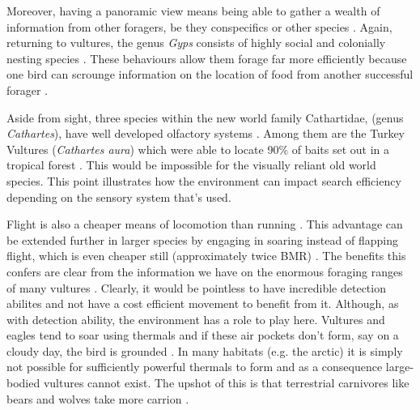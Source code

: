 \documentclass[a4paper,12pt]{article}
\begin{document}
Moreover, having a panoramic view means being able to gather a wealth of information from other foragers, be they conspecifics or other species \citep{jackson2008effect}. Again, returning to vultures, the genus \textit{Gyps} consists of highly social and colonially nesting species \citep{fernandez2015density}. These behaviours allow them forage far more efficiently because one bird can scrounge information on the location of food from another successful forager \citep{KaneVul}. 

Aside from sight, three species within the new world family Cathartidae, (genus \textit{Cathartes}), have well developed olfactory systems \citep{AR:AR22815}. Among them are the Turkey Vultures (\textit{Cathartes aura}) which were able to locate 90\% of baits set out in a tropical forest \citep{houston1986olfaction}. This would be impossible for the visually reliant old world species. This point illustrates how the environment can impact search efficiency depending on the sensory system that's used. 

Flight is also a cheaper means of locomotion than running \citep{tucker1975energetic}. This advantage can be extended further in larger species by engaging in soaring instead of flapping flight, which is even cheaper still (approximately twice BMR) \citep{hedenstrom1993migration}. The benefits this confers are clear from the information we have on the enormous foraging ranges of many vultures \citep{spiegel2013factors}. Clearly, it would be pointless to have incredible detection abilites and not have a cost efficient movement to benefit from it. Although, as with detection ability, the environment has a role to play here. Vultures and eagles tend to soar using thermals and if these air pockets don't form, say on a cloudy day, the bird is grounded \citep{mundy1992vultures}. In many habitats (e.g. the arctic) it is simply not possible for sufficiently powerful thermals to form and as a consequence large-bodied vultures cannot exist. The upshot of this is that terrestrial carnivores like bears and wolves take more carrion \citep{devault2003scavenging}. 
\end{document}
